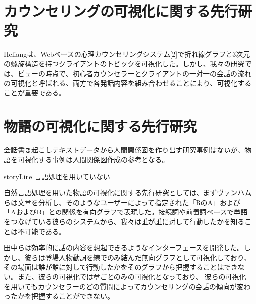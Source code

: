 \documentclass[shuuron]{kuee}
\begin{document}

\section{カウンセリングの可視化に関する先行研究}

Heliangは、Webベースの心理カウンセリングシステム[2]で折れ線グラフと3次元の螺旋構造を持つクライアントのトピックを可視化した。しかし、我々の研究では、ビューの時点で、初心者カウンセラーとクライアントの一対一の会話の流れの可視化と呼ばれる、両方で各発話内容を組み合わせることにより、可視化することが重要である。

\section{物語の可視化に関する先行研究}

会話書き起こしテキストデータから人間関係図を作り出す研究事例はないが、物語を可視化する事例は人間関係図作成の参考となる。

storyLine\cite{tanahashi2012design} \cite{tanahashi2015efficient}
言語処理を用いていない

自然言語処理を用いた物語の可視化に関する先行研究としては、まずヴァンハム\cite{van2009mapping}らは文章を分析し、そのようなユーザーによって指定された「BのA」および「AおよびB」との関係を有向グラフで表現した。接続詞や前置詞ベースで単語をつなげている彼らのシステムから、我々は誰が誰に対して行動したかを知ることは不可能である。

田中ら\cite{tanaka}は効率的に話の内容を想起できるようなインターフェースを開発した。しかし、彼らは登場人物動詞を線でのみ結んだ無向グラフとして可視化しており、その場面は誰が誰に対して行動したかをそのグラフから把握することはできない。また、彼らの可視化では章ごとのみの可視化となっており、 彼らの可視化を用いてもカウンセラーのどの質問によってカウンセリングの会話の傾向が変わったかを把握することができない。
\end{document}
